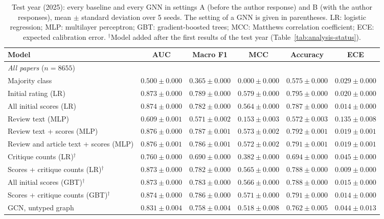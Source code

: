 \begin{table}[t]
\centering
\footnotesize
\caption{Test year (2025): every baseline and every GNN in settings A (before the author response) and B (with the author responses), mean $\pm$ standard deviation over 5 seeds. The setting of a GNN is given in parentheses. LR: logistic regression; MLP: multilayer perceptron; GBT: gradient-boosted trees; MCC: Matthews correlation coefficient; ECE: expected calibration error. $^{\dagger}$Model added after the first results of the test year (Table~\ref{tab:analysis-status}).}
\label{tab:main-full}
\begin{tabular}{lccccc}
\toprule
Model & AUC & Macro F1 & MCC & Accuracy & ECE \\
\midrule
\multicolumn{6}{l}{\emph{All papers} ($n = 8655$)} \\
Majority class & $0.500 \pm 0.000$ & $0.365 \pm 0.000$ & $0.000 \pm 0.000$ & $0.575 \pm 0.000$ & $0.029 \pm 0.000$ \\
Initial rating (LR) & $0.873 \pm 0.000$ & $0.789 \pm 0.000$ & $0.579 \pm 0.000$ & $0.795 \pm 0.000$ & $0.020 \pm 0.000$ \\
All initial scores (LR) & $0.874 \pm 0.000$ & $0.782 \pm 0.000$ & $0.564 \pm 0.000$ & $0.787 \pm 0.000$ & $0.014 \pm 0.000$ \\
Review text (MLP) & $0.609 \pm 0.001$ & $0.571 \pm 0.002$ & $0.153 \pm 0.003$ & $0.572 \pm 0.003$ & $0.135 \pm 0.008$ \\
Review text + scores (MLP) & $0.876 \pm 0.000$ & $0.787 \pm 0.001$ & $0.573 \pm 0.002$ & $0.792 \pm 0.001$ & $0.019 \pm 0.001$ \\
Review and article text + scores (MLP) & $0.876 \pm 0.001$ & $0.786 \pm 0.001$ & $0.572 \pm 0.002$ & $0.791 \pm 0.001$ & $0.019 \pm 0.001$ \\
Critique counts (LR)$^{\dagger}$ & $0.760 \pm 0.000$ & $0.690 \pm 0.000$ & $0.382 \pm 0.000$ & $0.694 \pm 0.000$ & $0.045 \pm 0.000$ \\
Scores + critique counts (LR)$^{\dagger}$ & $0.873 \pm 0.000$ & $0.782 \pm 0.000$ & $0.565 \pm 0.000$ & $0.788 \pm 0.000$ & $0.009 \pm 0.000$ \\
All initial scores (GBT)$^{\dagger}$ & $0.873 \pm 0.000$ & $0.783 \pm 0.000$ & $0.566 \pm 0.000$ & $0.788 \pm 0.000$ & $0.015 \pm 0.000$ \\
Scores + critique counts (GBT)$^{\dagger}$ & $0.874 \pm 0.000$ & $0.786 \pm 0.000$ & $0.571 \pm 0.000$ & $0.791 \pm 0.000$ & $0.014 \pm 0.000$ \\
GCN, untyped graph & $0.831 \pm 0.004$ & $0.758 \pm 0.004$ & $0.518 \pm 0.008$ & $0.762 \pm 0.005$ & $0.044 \pm 0.013$ \\

\end{tabular}
\end{table}
